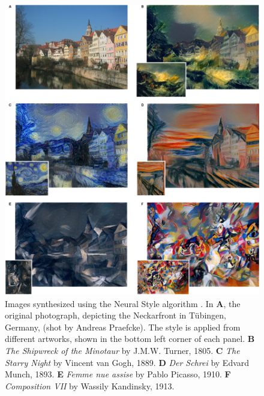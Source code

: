 \begin{figure}[p]
  \includegraphics[width=\textwidth]{gfx/neural-style-examples}
  \caption{
    Images synthesized using the Neural Style algorithm \cite{Gatys2015B}.
    In \textbf{A}, the original photograph, depicting the Neckarfront in T\"ubingen, Germany, (shot by Andreas Praefcke).
    The style is applied from different artworks, shown in the bottom left corner of each panel.
    \textbf{B} \emph{The Shipwreck of the Minotaur} by J.M.W. Turner, 1805.
    \textbf{C} \emph{The Starry Night} by Vincent van Gogh, 1889.
    \textbf{D} \emph{Der Schrei} by Edvard Munch, 1893.
    \textbf{E} \emph{Femme nue assise} by Pablo Picasso, 1910.
    \textbf{F} \emph{Composition VII} by Wassily Kandinsky, 1913.
  }
  \label{sub:system:examples}
\end{figure}

